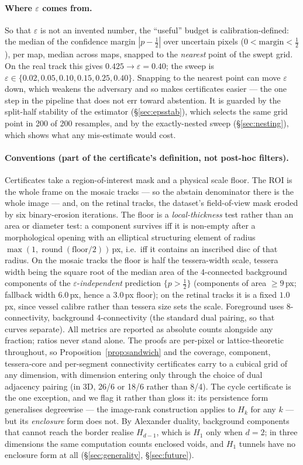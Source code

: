 \documentclass[10pt]{article}
\newcommand{\eps}{\varepsilon}
\begin{document}
\paragraph{Where $\eps$ comes from.} So that $\eps$ is not an invented
number, the ``useful'' budget is calibration-defined: the median of the
confidence margin $|p-\tfrac12|$ over uncertain pixels
($0<\text{margin}<\tfrac12$), per map, median across maps, snapped to the
\emph{nearest} point of the swept grid. On the real track this gives $0.425 \to \eps=0.40$; the sweep
is $\eps \in \{0.02, 0.05, 0.10, 0.15, 0.25, 0.40\}$. Snapping to the
nearest point can move $\eps$ down, which weakens the adversary and so
makes certificates easier --- the one step in the pipeline that does not
err toward abstention. It is guarded by the split-half stability of the
estimator (\S\ref{sec:epsstab}), which selects the same grid point in 200
of 200 resamples, and by the exactly-nested sweep (\S\ref{sec:nesting}),
which shows what any mis-estimate would cost.

\paragraph{Conventions (part of the certificate's definition, not post-hoc
filters).}
Certificates take a region-of-interest mask and a physical scale floor.
The ROI is the whole frame on the mosaic tracks --- so the abstain
denominator there is the whole image --- and, on the retinal tracks, the
dataset's field-of-view mask eroded by six binary-erosion iterations. The
floor is a \emph{local-thickness} test rather than an area or diameter
test: a component survives iff it is non-empty after a morphological
opening with an elliptical structuring element of radius
$\max(1, \operatorname{round}(\text{floor}/2))$\,px, i.e.\ iff it
contains an inscribed disc of that radius. On the mosaic tracks the floor
is half the tessera-width scale, tessera width being the square root of the
median area of the 4-connected background components of the
$\eps$-\emph{independent} prediction $\{p > \tfrac12\}$ (components of
area $\ge 9$\,px; fallback width $6.0$\,px, hence a $3.0$\,px floor); on
the retinal tracks it is a fixed $1.0$\,px, since vessel calibre rather
than tessera size sets the scale. Foreground uses 8-connectivity,
background 4-connectivity (the standard dual pairing, so that curves
separate). All metrics are reported as
absolute counts alongside any fraction; ratios never stand alone. The
proofs are per-pixel or lattice-theoretic throughout, so
Proposition~\ref{prop:sandwich} and the coverage, component,
tessera-core and per-segment connectivity certificates carry to a cubical
grid of any dimension, with dimension entering only through the choice of
dual adjacency pairing (in 3D, 26/6 or 18/6 rather than 8/4). The cycle
certificate is the one exception, and we flag it rather than gloss it:
its persistence form generalises degreewise --- the image-rank
construction applies to $H_k$ for any $k$ --- but its \emph{enclosure}
form does not. By Alexander duality, background components that cannot
reach the border realise $H_{d-1}$, which is $H_1$ only when $d=2$; in
three dimensions the same computation counts enclosed voids, and $H_1$
tunnels have no enclosure form at all
(\S\ref{sec:generality}, \S\ref{sec:future}).
\end{document}

